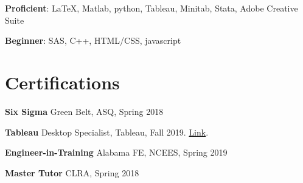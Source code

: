 \documentclass[margin,line]{res}
\begin{document}
\begin{resume}
{\bf Proficient}:  \LaTeX, Matlab, python, Tableau, Minitab, Stata, Adobe Creative Suite
\vspace*{-3mm}

{\bf Beginner}:  SAS, C++, HTML/CSS, javascript
\vspace*{-3mm}


\vspace{.15cm}

\section{\sc Certifications}
{\bf Six Sigma} Green Belt, ASQ, Spring 2018
\vspace*{-3mm}

{\bf Tableau} Desktop Specialist, Tableau, Fall 2019. \href{https://www.credly.com/badges/e9a605a8-1977-4a1c-ab24-149a37c7fb36/linked_in_profile}{Link}.
\vspace*{-3mm}

{\bf Engineer-in-Training} Alabama FE, NCEES, Spring 2019
\vspace*{-3mm}

{\bf Master Tutor} CLRA, Spring 2018
\vspace*{-3mm}



\end{resume}
\end{document}
